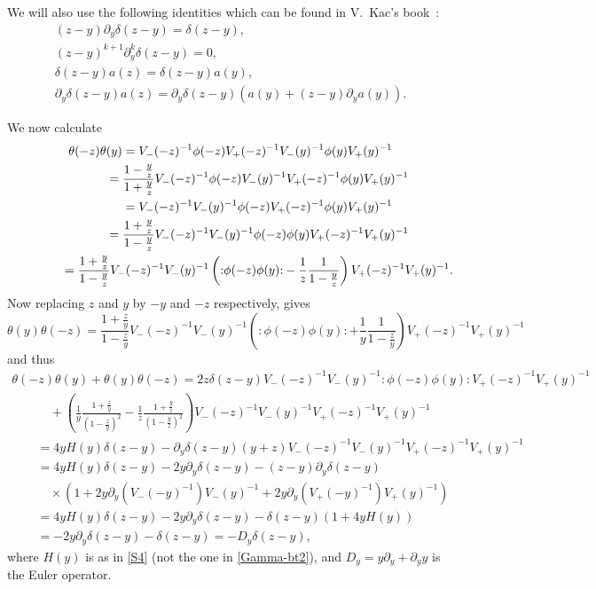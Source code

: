 \documentclass[pdftex]{sigma}
\numberwithin{equation}{section}
\begin{document}
We will also use the
following identities which can be found in V.~Kac's book~\cite{KacVAfB}:
\begin{gather*}
(z-y)\partial_y\delta(z-y) =\delta(z-y), \\
(z-y)^{k+1}\partial_y^{k}\delta(z-y) =0, \\
\delta(z-y)a(z) =\delta(z-y)a(y), \\
\partial_y\delta(z-y)a(z) =\partial_y\delta(z-y)\left(a(y)+(z-y)\partial_ya(y)\right).
\end{gather*}

We now calculate
\begin{gather*}
\theta(-z)\theta(y) =V_-(-z)^{-1}\phi(-z)V_+(-z)^{-1}V_-(y)^{-1}\phi(y)V_+(y)^{-1}\\
\hphantom{\theta(-z)\theta(y)}{} =\frac{1-\frac{y}{z}}{1+\frac{y}{z}}
V_-(-z)^{-1}\phi(-z)V_-(y)^{-1}V_+(-z)^{-1}\phi(y)V_+(y)^{-1}\\
\hphantom{\theta(-z)\theta(y)}{}=V_-(-z)^{-1}V_-(y)^{-1}\phi(-z)V_+(-z)^{-1}\phi(y)V_+(y)^{-1}\\
\hphantom{\theta(-z)\theta(y)}{} =\frac{1+\frac{y}{z}}{1-\frac{y}{z}}
V_-(-z)^{-1}V_-(y)^{-1}\phi(-z)\phi(y)V_+(-z)^{-1}V_+(y)^{-1}\\
\hphantom{\theta(-z)\theta(y)}{} =\frac{1+\frac{y}{z}}{1-\frac{y}{z}}
V_-(-z)^{-1}V_-(y)^{-1}\left({:}\phi(-z)\phi(y){:}-\frac{1}{z}\frac{1}{1-\frac{y}{z}}\right)
V_+(-z)^{-1}V_+(y)^{-1}.
\end{gather*}
Now replacing $z$ and $y$ by $-y$ and $-z$ respectively, gives
\[
\theta(y)\theta(-z)=\frac{1+\frac{z}{y}}{1-\frac{z}{y}}
V_-(-z)^{-1}V_-(y)^{-1}\left({:}\phi(-z)\phi(y){:}+\frac{1}{y}\frac{1}{1-\frac{z}{y}}\right)
V_+(-z)^{-1}V_+(y)^{-1}
\]
and thus
 \begin{gather}
 \theta(-z)\theta(y)+\theta(y)\theta(-z)
=
2z\delta(z-y)V_-(-z)^{-1}V_-(y)^{-1}{:}\phi(-z)\phi(y){:}
V_+(-z)^{-1}V_+(y)^{-1}\nonumber\\
\qquad\quad{} + \left( \frac 1y \frac{1+\frac{z}{y}}{(1-\frac{z}{y})^2}-\frac
1z \frac{1+\frac{y}{z}}{(1-\frac{y}{z})^2}\right)
V_-(-z)^{-1}V_-(y)^{-1} V_+(-z)^{-1}V_+(y)^{-1}\nonumber\\
\qquad {}
= 4yH(y)\delta(z-y)-\partial_y\delta(z-y)(y+z)V_-(-z)^{-1}V_-(y)^{-1}
V_+(-z)^{-1}V_+(y)^{-1}\nonumber\\
\qquad {}
= 4yH(y)\delta(z-y)-2y\partial_y\delta(z-y)
-(z-y)\partial_y\delta(z-y) \nonumber\\
\qquad\quad{}
 \times\left(1+2y\partial_y\left(V_-(-y)^{-1}\right)V_-(y)^{-1}
+2y\partial_y\left(V_+(-y)^{-1}\right)V_+(y)^{-1}\right)\nonumber\\
\qquad {}
= 4yH(y)\delta(z-y)-2y\partial_y\delta(z-y)-
\delta(z-y)\left(1+4yH(y)\right)\nonumber\\
\qquad {}
= {-2}y\partial_y\delta(z-y)-\delta(z-y)=-D_y\delta(z-y) ,\label{thetatheta-equality}
\end{gather}
where $H(y)$ is as in \eqref{S4} (not the one in \eqref{Gamma-bt2}),
and $D_y=y\partial_y+\partial_y y$ is the Euler operator.
\end{document}
